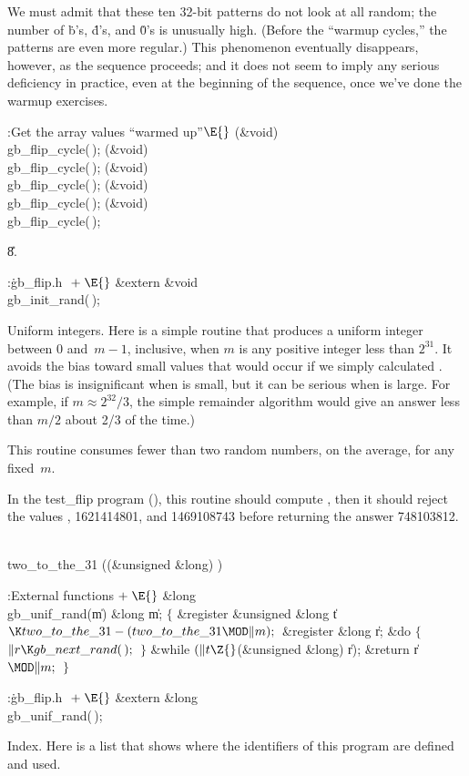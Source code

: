We must admit that these ten 32-bit patterns do not look at all
random; the number of \.b's, \.d's, and \.0's is unusually high. (Before
the ``warmup cycles,'' the patterns are even more regular.) This
phenomenon eventually disappears, however, as the sequence proceeds;
and it does not seem to imply any serious deficiency in practice, even
at the beginning of the sequence, once we've done the warmup exercises.

\Y\B\4:Get the array values ``warmed up''\X${}\E{}$\6
(\&{void}) \\{gb\_flip\_cycle}(\,);\6
(\&{void}) \\{gb\_flip\_cycle}(\,);\6
(\&{void}) \\{gb\_flip\_cycle}(\,);\6
(\&{void}) \\{gb\_flip\_cycle}(\,);\6
(\&{void}) \\{gb\_flip\_cycle}(\,);\par
\U8.\fi

\B{}:\.{gb\_flip.h }\X${}\mathrel+\E{}$\6
\&{extern} \&{void} \\{gb\_init\_rand}(\,);\par
\fi

Uniform integers.
Here is a simple routine that produces a uniform integer between
0 and~$m-1$, inclusive, when $m$ is any positive integer less than $2^{31}$.
It avoids the bias toward small values that would occur if we simply
calculated . (The bias is insignificant
when  is
small, but it can be serious when  is large. For example, if
$m\approx 2^{32}\!/3$, the simple remainder algorithm would give an answer
less than $m/2$ about 2/3 of the time.)

This routine consumes fewer than two random numbers, on the average,
for any fixed~$m$.

In the \.{test\_flip} program (), this routine should compute %
,
then it should reject the values , 1621414801, and
1469108743 before returning the answer 748103812.

\Y\B\4\D\\{two\_to\_the\_31}\5
((\&{unsigned} \&{long}) )\par
\Y\B\4:External functions\X${}\mathrel+\E{}$\6
\1\1\&{long} \\{gb\_unif\_rand}(\|m)\6
\&{long} \|m;\2\2\6
${}\{{}$\5
\1\&{register} \&{unsigned} \&{long} \|t${}\K\\{two\_to\_the\_31}-(\\{two\_to%
\_the\_31}\MOD\|m);{}$\6
\&{register} \&{long} \|r;\7
\&{do}\5
${}\{{}$\1\6
${}\|r\K\\{gb\_next\_rand}(\,);{}$\6
\4${}\}{}$\5
\2\5
\&{while} ${}(\|t\Z{}$(\&{unsigned} \&{long}) \|r);\6
\&{return} \|r${}\MOD\|m;{}$\6
\4${}\}{}$\2\par
\fi

\B{}:\.{gb\_flip.h }\X${}\mathrel+\E{}$\6
\&{extern} \&{long} \\{gb\_unif\_rand}(\,);\par
\fi

Index. Here is a list that shows where the identifiers of this program
are
defined and used.
\fi

\inx
\fin
\con
